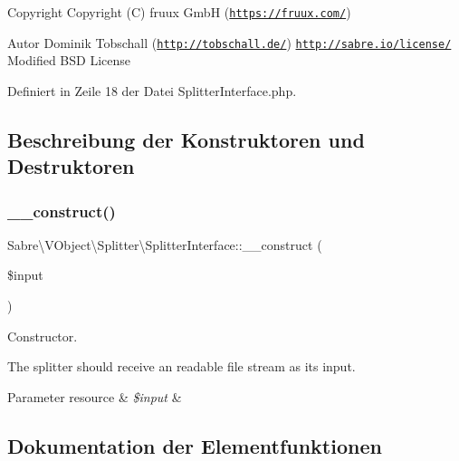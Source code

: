 \begin{DoxyCopyright}{Copyright}
Copyright (C) fruux GmbH (\href{https://fruux.com/}{\tt https\+://fruux.\+com/}) 
\end{DoxyCopyright}
\begin{DoxyAuthor}{Autor}
Dominik Tobschall (\href{http://tobschall.de/}{\tt http\+://tobschall.\+de/})  \href{http://sabre.io/license/}{\tt http\+://sabre.\+io/license/} Modified B\+SD License 
\end{DoxyAuthor}


Definiert in Zeile 18 der Datei Splitter\+Interface.\+php.



\subsection{Beschreibung der Konstruktoren und Destruktoren}
\mbox{\label{interface_sabre_1_1_v_object_1_1_splitter_1_1_splitter_interface_a41835a43cee318c5837cd48f7ab919b8}} 
\subsubsection{\texorpdfstring{\+\_\+\+\_\+construct()}{\_\_construct()}}
{\footnotesize\ttfamily Sabre\textbackslash{}\+V\+Object\textbackslash{}\+Splitter\textbackslash{}\+Splitter\+Interface\+::\+\_\+\+\_\+construct (\begin{DoxyParamCaption}\item[{}]{\$input }\end{DoxyParamCaption})}

Constructor.

The splitter should receive an readable file stream as it\textquotesingle{}s input.


\begin{DoxyParams}[1]{Parameter}
resource & {\em \$input} & \\
\hline
\end{DoxyParams}


\subsection{Dokumentation der Elementfunktionen}
\mbox{\label{interface_sabre_1_1_v_object_1_1_splitter_1_1_splitter_interface_ae8684178a369fdafebc51e64a5b76ab8}} 
